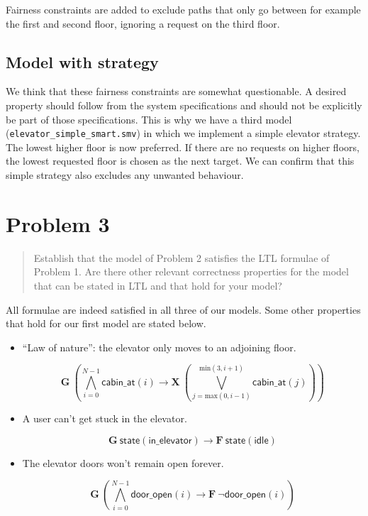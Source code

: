 \documentclass[a4paper,10pt]{article}
\newcommand{\LTLG}{\mathbf{G~}}
\newcommand{\LTLF}{\mathbf{F~}}
\newcommand{\LTLX}{\mathbf{X~}}
\newcommand{\disjall}[2]{\mathop{\bigvee}\limits_{#1}^{#2}}
\newcommand{\conjall}[2]{\mathop{\bigwedge}\limits_{#1}^{#2}}
\newcommand{\dooropen}[1]{\mathsf{door\_open}(#1)}
\newcommand{\cabinat}[1]{\mathsf{cabin\_at}(#1)}
\newcommand{\state}[1]{\mathsf{state}(\mathsf{#1})}
\newcommand{\imply}{\rightarrow}
\begin{document}
	Fairness constraints are added to exclude paths that only go between for example the first and second floor, ignoring a request on the third floor.
	
	\subsection{Model with strategy}
	We think that these fairness constraints are somewhat questionable. A desired property should follow from the system specifications and should not be explicitly be part of those specifications. This is why we have a third model (\texttt{elevator\_simple\_smart.smv}) in which we implement a simple elevator strategy. The lowest higher floor is now preferred. If there are no requests on higher floors, the lowest requested floor is chosen as the next target. We can confirm that this simple strategy also excludes any unwanted behaviour.
	
	\section{Problem 3}
	
	\begin{quote}
		Establish that the model of Problem 2 satisfies the LTL formulae of Problem 1. Are there other relevant correctness properties for the model that can be stated in LTL and that hold for your model?
	\end{quote}
	
	All formulae are indeed satisfied in all three of our models. Some other properties that hold for our first model are stated below.
	
	\begin{itemize}
		\item
			``Law of nature'': the elevator only moves to an adjoining floor.
			
			\[
				\LTLG \left( \conjall{i=0}{N-1} \cabinat{i} \imply \LTLX \left( \disjall{j=\textrm{max}(0, i-1)}{\textrm{min}(3, i+1)} \cabinat{j} \right) \right)
			\]
		
		\item
			A user can't get stuck in the elevator.
			
			\[
				\LTLG \state{in\_elevator} \imply \LTLF \state{idle}
			\]
		
		\item
			The elevator doors won't remain open forever.
			
			\[
				\LTLG \left( \conjall{i=0}{N-1} \dooropen{i} \imply \LTLF \neg \dooropen{i} \right)
			\]
	\end{itemize}
	
\end{document}
